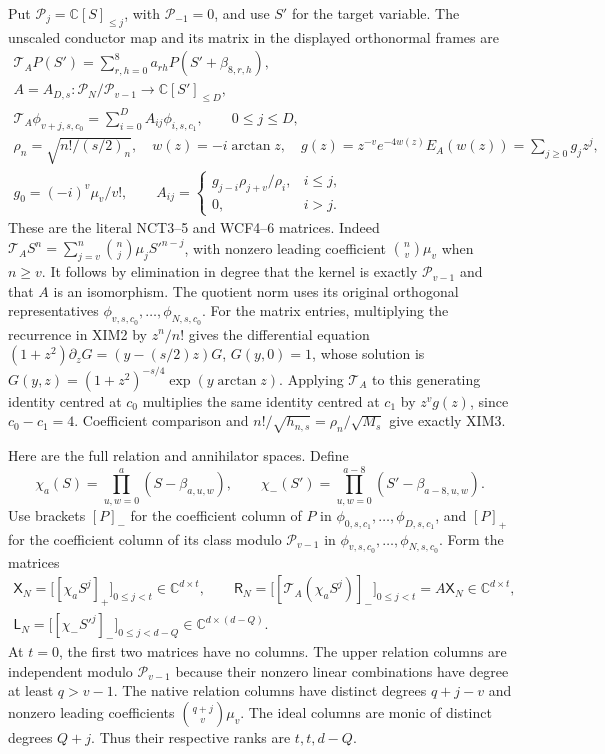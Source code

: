 \documentclass[11pt,a4paper]{article}
\begin{document}
Put $\mathcal P_j=\mathbb C[S]_{\le j}$, with $\mathcal P_{-1}=0$,
and use $S'$ for the target variable. The unscaled conductor map and its
matrix in the displayed orthonormal frames are
\[
\begin{gathered}
 \mathcal T_AP(S')=\sum_{r,h=0}^{8}a_{rh}P(S'+\beta_{8,r,h}),\\
 A=A_{D,s}:\mathcal P_N/\mathcal P_{v-1}\longrightarrow
             \mathbb C[S']_{\le D},\\
 \mathcal T_A\phi_{v+j,s,c_0}
     =\sum_{i=0}^D A_{ij}\phi_{i,s,c_1},\qquad 0\le j\le D,\\
 \rho_n=\sqrt{n!/(s/2)_n},\quad
 w(z)=-i\arctan z,\quad
 g(z)=z^{-v}e^{-4w(z)}E_A(w(z))=\sum_{j\ge0}g_jz^j,\\
 g_0=(-i)^v\mu_v/v!,\qquad
 A_{ij}=\begin{cases}g_{j-i}\rho_{j+v}/\rho_i,&i\le j,\\
                         0,&i>j.
          \end{cases}
\end{gathered}\tag{XIM3}
\]
These are the literal NCT3--5 and WCF4--6 matrices. Indeed
$\mathcal T_AS^n=\sum_{j=v}^n\binom nj\mu_jS'^{n-j}$, with
nonzero leading coefficient $\binom nv\mu_v$ when $n\ge v$.
It follows by elimination in degree that the kernel is exactly
$\mathcal P_{v-1}$ and that $A$ is an isomorphism. The quotient
norm uses its original orthogonal representatives
$\phi_{v,s,c_0},\ldots,\phi_{N,s,c_0}$.
For the matrix entries, multiplying the recurrence in XIM2 by
$z^n/n!$ gives the differential equation
$(1+z^2)\partial_zG=(y-(s/2)z)G$, $G(y,0)=1$, whose solution is
$G(y,z)=(1+z^2)^{-s/4}\exp(y\arctan z)$.
Applying $\mathcal T_A$ to this generating identity centred at $c_0$
multiplies the same identity centred at $c_1$ by $z^vg(z)$, since
$c_0-c_1=4$. Coefficient comparison and
$n!/\sqrt{h_{n,s}}=\rho_n/\sqrt{M_s}$ give exactly XIM3.

Here are the full relation and annihilator spaces. Define
\[
 \chi_a(S)=\prod_{u,w=0}^{a}(S-\beta_{a,u,w}),\qquad
 \chi_-(S')=\prod_{u,w=0}^{a-8}(S'-\beta_{a-8,u,w}).
 \tag{XIM4}
\]
Use brackets $[P]_-$ for the coefficient column of $P$ in
$\phi_{0,s,c_1},\ldots,\phi_{D,s,c_1}$, and $[P]_+$ for the
coefficient column of its class modulo $\mathcal P_{v-1}$ in
$\phi_{v,s,c_0},\ldots,\phi_{N,s,c_0}$. Form the matrices
\[
\begin{gathered}
 \mathsf X_N=\bigl[[\chi_aS^j]_+\bigr]_{0\le j<t}
       \in\mathbb C^{d\times t},\qquad
 \mathsf R_N=\bigl[[\mathcal T_A(\chi_aS^j)]_-\bigr]_{0\le j<t}
       =A\mathsf X_N\in\mathbb C^{d\times t},\\
 \mathsf L_N=\bigl[[\chi_-S'^j]_-\bigr]_{0\le j<d-Q}
       \in\mathbb C^{d\times(d-Q)}.
\end{gathered}\tag{XIM5}
\]
At $t=0$, the first two matrices have no columns. The upper relation
columns are independent modulo $\mathcal P_{v-1}$ because their
nonzero linear combinations have degree at least $q>v-1$. The
native relation columns have distinct degrees $q+j-v$ and nonzero
leading coefficients $\binom{q+j}{v}\mu_v$. The ideal columns are
monic of distinct degrees $Q+j$. Thus their respective ranks are
$t,t,d-Q$.
\end{document}
